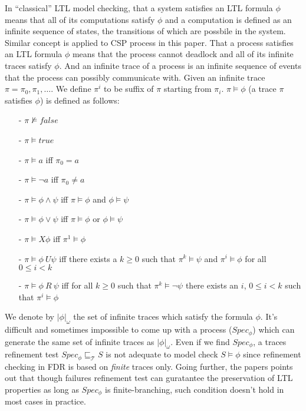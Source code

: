 \documentclass{llncs}
\newcommand{\csptracesmodel}{\mathcal{T}}
\begin{document}
In ``classical'' LTL model checking, that a system satisfies an LTL formula $\phi$ 
means that all of its computations satisfy $\phi$ and a computation is defined as an
infinite sequence
of states, the transitions of which are possbile in the system. Similar concept is applied to
CSP process in this paper. That a process satisfies an LTL formula $\phi$ means that
the process cannot deadlock and all of its infinite traces satisfy $\phi$. 
And an infinite trace of a process is an infinite sequence of events that
the process can possibly communicate with. Given an infinite trace $\pi =
\pi_0,\pi_1,\dots$. We define $\pi^i$ to be suffix of $\pi$ starting from
$\pi_i$. $\pi \models \phi$ (a trace $\pi$ satisfies $\phi$) is
defined as follows:
\begin{itemize}
\item[-] $\pi \not\models false$
\item[-] $\pi \models true$
\item[-] $\pi \models a$ iff $\pi_0 = a$
\item[-] $\pi \models \neg a$ iff $\pi_0 \neq a$
\item[-] $\pi \models \phi \land \psi$ iff $\pi \models \phi$ and $\phi \models \psi$
\item[-] $\pi \models \phi \lor \psi$ iff $\pi \models \phi$ or $\phi \models \psi$
\item[-] $\pi \models X\phi$ iff $\pi^1 \models \phi$
\item[-] $\pi \models \phi\ U \psi$ iff there exists a $k \geq 0$ such that
$\pi^k \models \psi$ and $\pi^i \models \phi$ for all $0 \leq i < k$
\item[-] $\pi \models \phi\ R\ \psi$ iff for all $k \geq 0$ such that $\pi^k
\models \neg \psi$ there exists an $i$, $0 \leq i < k$ such that $\pi^i \models \phi$
\end{itemize}

We denote by $|\phi|_\omega$ the set of infinite traces which satisfy the
formula $\phi$. It's difficult and sometimes impossible to come up with a
process ($Spec_\phi$) which can generate the same set of infinite traces
 as $|\phi|_\omega$. Even if we find
$Spec_\phi$, a traces refinement test $Spec_\phi \sqsubseteq_\csptracesmodel S$
is not adequate to model check $S \models \phi$ since refinement checking in FDR is based
on \emph{finite} traces only. Going further, the papers points out that though failures
refinement test can guratantee the preservation of LTL properties as long as
$Spec_\phi$ is finite-branching, such condition doesn't hold in most cases
in practice.
\end{document}
